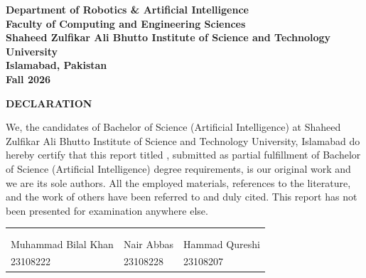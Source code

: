 \par\bigskip
\vspace{48pt}

\begin{center}
\normalsize\textbf{Department of Robotics \& Artificial Intelligence}\\
\normalsize\textbf{Faculty of Computing and Engineering Sciences}\\
\normalsize\textbf{Shaheed Zulfikar Ali Bhutto Institute of Science and Technology University}\\
\normalsize\textbf{Islamabad, Pakistan}\\
\vspace{10pt}
\normalsize\textbf{Fall 2026}\\
\end{center}

\singlespacing

\newpage
\thispagestyle{empty}
\centerline{\textbf{\Huge DECLARATION}}
\par\bigskip
\par\bigskip

We, the candidates of Bachelor of Science (Artificial Intelligence) at Shaheed Zulfikar Ali Bhutto Institute of Science and Technology University, Islamabad do hereby certify that this report titled \textbf{\projecttitle}, submitted as partial fulfillment of Bachelor of Science (Artificial Intelligence) degree requirements, is our original work and we are its sole authors. All the employed materials, references to the literature, and the work of others have been referred to and duly cited. This report has not been presented for examination anywhere else.

\par\bigskip
\par\bigskip
\par\bigskip
\par\bigskip
\vspace{18pt}
\begin{table}[!ht]
    \centering
    \begin{tabular}{C{0.3\textwidth} C{0.3\textwidth} C{0.3\textwidth}}
         &  &  \\ \cmidrule(lr){1-1} \cmidrule(lr){2-2} \cmidrule(lr){3-3}
         &  &  \\
         Muhammad Bilal Khan & Nair Abbas & Hammad Qureshi \\
         23108222 & 23108228 & 23108207 \\
    \end{tabular}
\end{table}

